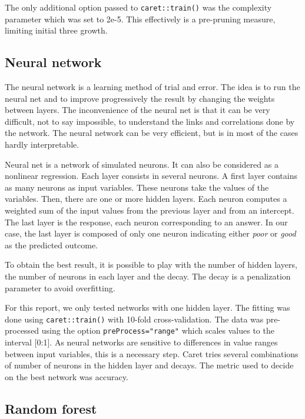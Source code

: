 \documentclass[11pt,]{article}
\begin{document}
The only additional option passed to \texttt{caret::train()} was the
complexity parameter which was set to 2e-5. This effectively is a
pre-pruning measure, limiting initial three growth.

\hypertarget{neural-network}{%
\subsection{Neural network}\label{neural-network}}

The neural network is a learning method of trial and error. The idea is
to run the neural net and to improve progressively the result by
changing the weights between layers. The inconvenience of the neural net
is that it can be very difficult, not to say impossible, to understand
the links and correlations done by the network. The neural network can
be very efficient, but is in most of the cases hardly interpretable.

Neural net is a network of simulated neurons. It can also be considered
as a nonlinear regression. Each layer consists in several neurons. A
first layer contains as many neurons as input variables. These neurons
take the values of the variables. Then, there are one or more hidden
layers. Each neuron computes a weighted sum of the input values from the
previous layer and from an intercept. The last layer is the response,
each neuron corresponding to an answer. In our case, the last layer is
composed of only one neuron indicating either \emph{poor} or \emph{good}
as the predicted outcome.

To obtain the best result, it is possible to play with the number of
hidden layers, the number of neurons in each layer and the decay. The
decay is a penalization parameter to avoid overfitting.

For this report, we only tested networks with one hidden layer. The
fitting was done using \texttt{caret::train()} with 10-fold
cross-validation. The data was pre-processed using the option
\texttt{preProcess="range"} which scales values to the interval
{[}0:1{]}. As neural networks are sensitive to differences in value
ranges between input variables, this is a necessary step. Caret tries
several combinations of number of neurons in the hidden layer and
decays. The metric used to decide on the best network was accuracy.

\hypertarget{random-forest}{%
\subsection{Random forest}\label{random-forest}}
\end{document}
